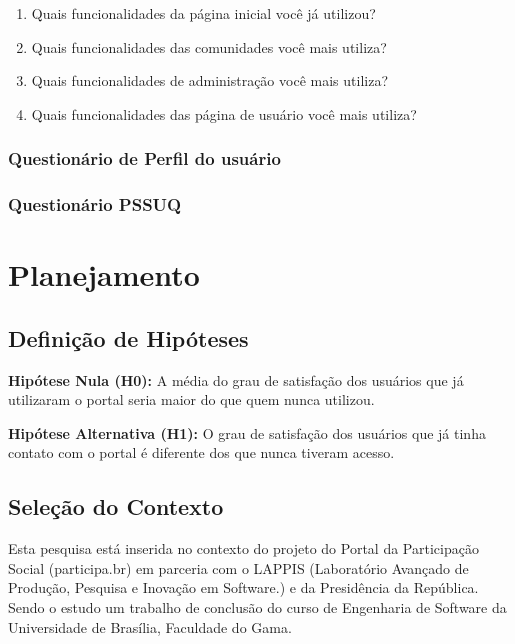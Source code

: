 \begin{enumerate}
	\item Quais funcionalidades da página inicial você já utilizou?
	\item Quais funcionalidades das comunidades você mais utiliza?
	\item Quais funcionalidades de administração você mais utiliza? 
	\item Quais funcionalidades das página de usuário você mais utiliza?
\end{enumerate}


\subsubsection{Questionário de Perfil do usuário}


\subsubsection{Questionário PSSUQ}

		

\section{Planejamento}

\subsection{Definição de Hipóteses}

\textbf{Hipótese Nula (H0):} A média do grau de satisfação dos usuários que já utilizaram o portal seria maior do que quem nunca utilizou.

\textbf{Hipótese Alternativa (H1):} O grau de satisfação dos usuários que já tinha contato com o portal é diferente dos que nunca tiveram acesso.



\subsection{Seleção do Contexto}

Esta pesquisa está inserida no contexto do projeto do Portal da Participação Social (participa.br) em parceria com o LAPPIS (Laboratório Avançado de Produção, Pesquisa e Inovação em Software.) e da Presidência da República. Sendo o estudo um trabalho de conclusão do curso de Engenharia de Software da Universidade de Brasília, Faculdade do Gama.


